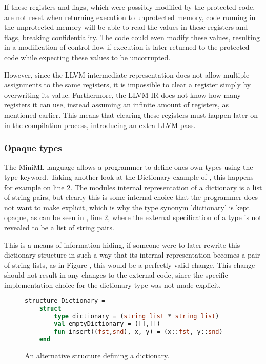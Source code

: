 \documentclass[10pt,a4paper,master=cws, masteroption=ai,english,inputenc=utf8]{kulemt}
\begin{document}
If these registers and flags, which were possibly modified by the protected code, are not reset when returning execution to unprotected memory, code running in the unprotected memory will be able to read the values in these registers and flags, breaking confidentiality. The code could even modify these values, resulting in a modification of control flow if execution is later returned to the protected code while expecting these values to be uncorrupted.

However, since the LLVM intermediate representation does not allow multiple assignments to the same registers, it is impossible to clear a register simply by overwriting its value.
Furthermore, the LLVM IR does not know how many registers it can use, instead assuming an infinite amount of registers, as mentioned earlier. This means that clearing these registers must happen later on in the compilation process, introducing an extra LLVM pass.

\subsubsection{Opaque types}

The \mbox{MiniML} language allows a programmer to define ones own types using the type keyword. Taking another look at the Dictionary example of , this happens for example on line 2. The modules internal representation of a dictionary is a list of string pairs, but clearly this is some internal choice that the programmer does not want to make explicit, which is why the type synonym 'dictionary' is kept opaque, as can be seen in , line 2, where the external specification of a type is not revealed to be a list of string pairs.

This is a means of information hiding, if someone were to later rewrite this dictionary structure in such a way that its internal representation becomes a pair of string lists, as in Figure , this would be a perfectly valid change. This change should not result in any changes to the external code, since the specific implementation choice for the dictionary type was not made explicit.

\begin{figure}[!htb]
\begin{lstlisting}[frame=single, language=ML]
structure Dictionary =
    struct
        type dictionary = (string list * string list)
        val emptyDictionary = ([],[])
        fun insert((fst,snd), x, y) = (x::fst, y::snd)
    end
\end{lstlisting}
\label{code:DictionaryStructureExample2}
\caption{An alternative structure defining a dictionary.}
\end{figure}
\end{document}
